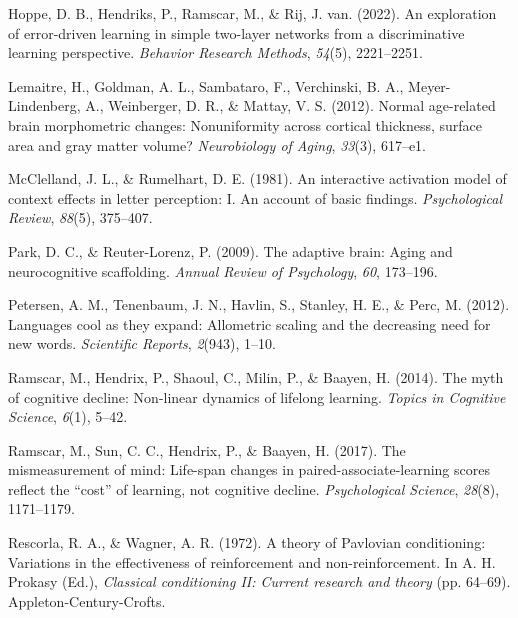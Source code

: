 \documentclass[
  man]{apa6}
\newlength{\cslhangindent}
\newlength{\cslentryspacingunit} %
\newenvironment{CSLReferences}[2] %
 {%
  \setlength{\parindent}{0pt}
  \ifodd #1
  \let\oldpar\par
  \def\par{\hangindent=\cslhangindent\oldpar}
  \fi
  \setlength{\parskip}{#2\cslentryspacingunit}
 }%
 {}
\begin{document}
\begin{CSLReferences}{1}{0}
\leavevmode{}%
Hoppe, D. B., Hendriks, P., Ramscar, M., \& Rij, J. van. (2022). An exploration of error-driven learning in simple two-layer networks from a discriminative learning perspective. \emph{Behavior Research Methods}, \emph{54}(5), 2221--2251.

\leavevmode{}%
Lemaitre, H., Goldman, A. L., Sambataro, F., Verchinski, B. A., Meyer-Lindenberg, A., Weinberger, D. R., \& Mattay, V. S. (2012). Normal age-related brain morphometric changes: Nonuniformity across cortical thickness, surface area and gray matter volume? \emph{Neurobiology of Aging}, \emph{33}(3), 617--e1.

\leavevmode{}%
McClelland, J. L., \& Rumelhart, D. E. (1981). An interactive activation model of context effects in letter perception: I. An account of basic findings. \emph{Psychological Review}, \emph{88}(5), 375--407.

\leavevmode{}%
Park, D. C., \& Reuter-Lorenz, P. (2009). The adaptive brain: Aging and neurocognitive scaffolding. \emph{Annual Review of Psychology}, \emph{60}, 173--196.

\leavevmode{}%
Petersen, A. M., Tenenbaum, J. N., Havlin, S., Stanley, H. E., \& Perc, M. (2012). Languages cool as they expand: Allometric scaling and the decreasing need for new words. \emph{Scientific Reports}, \emph{2}(943), 1--10.

\leavevmode{}%
Ramscar, M., Hendrix, P., Shaoul, C., Milin, P., \& Baayen, H. (2014). The myth of cognitive decline: Non-linear dynamics of lifelong learning. \emph{Topics in Cognitive Science}, \emph{6}(1), 5--42.

\leavevmode{}%
Ramscar, M., Sun, C. C., Hendrix, P., \& Baayen, H. (2017). The mismeasurement of mind: Life-span changes in paired-associate-learning scores reflect the {``cost''} of learning, not cognitive decline. \emph{Psychological Science}, \emph{28}(8), 1171--1179.

\leavevmode{}%
Rescorla, R. A., \& Wagner, A. R. (1972). {A theory of Pavlovian conditioning: Variations in the effectiveness of reinforcement and non-reinforcement}. In A. H. Prokasy (Ed.), \emph{Classical conditioning II: Current research and theory} (pp. 64--69). Appleton-Century-Crofts.


\end{CSLReferences}
\end{document}
